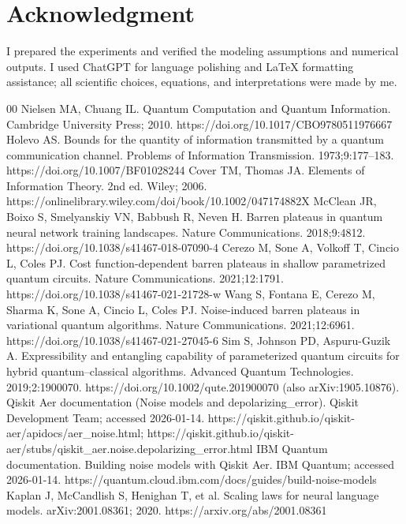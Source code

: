 \documentclass[]{ieeeaccess}
\begin{document}
\section*{Acknowledgment}
I prepared the experiments and verified the modeling assumptions and numerical outputs. I used ChatGPT \cite{ref19} for language polishing and \LaTeX{} formatting assistance; all scientific choices, equations, and interpretations were made by me.

\FloatBarrier
\begin{thebibliography}{00}
 Nielsen MA, Chuang IL. Quantum Computation and Quantum Information. Cambridge University Press; 2010. https://doi.org/10.1017/CBO9780511976667
 Holevo AS. Bounds for the quantity of information transmitted by a quantum communication channel. Problems of Information Transmission. 1973;9:177--183. https://doi.org/10.1007/BF01028244
 Cover TM, Thomas JA. Elements of Information Theory. 2nd ed. Wiley; 2006. https://onlinelibrary.wiley.com/doi/book/10.1002/047174882X
 McClean JR, Boixo S, Smelyanskiy VN, Babbush R, Neven H. Barren plateaus in quantum neural network training landscapes. Nature Communications. 2018;9:4812. https://doi.org/10.1038/s41467-018-07090-4
 Cerezo M, Sone A, Volkoff T, Cincio L, Coles PJ. Cost function-dependent barren plateaus in shallow parametrized quantum circuits. Nature Communications. 2021;12:1791. https://doi.org/10.1038/s41467-021-21728-w
 Wang S, Fontana E, Cerezo M, Sharma K, Sone A, Cincio L, Coles PJ. Noise-induced barren plateaus in variational quantum algorithms. Nature Communications. 2021;12:6961. https://doi.org/10.1038/s41467-021-27045-6
 Sim S, Johnson PD, Aspuru-Guzik A. Expressibility and entangling capability of parameterized quantum circuits for hybrid quantum--classical algorithms. Advanced Quantum Technologies. 2019;2:1900070. https://doi.org/10.1002/qute.201900070 (also arXiv:1905.10876).
 Qiskit Aer documentation (Noise models and depolarizing\_error). Qiskit Development Team; accessed 2026-01-14. https://qiskit.github.io/qiskit-aer/apidocs/aer\_noise.html; https://qiskit.github.io/qiskit-aer/stubs/qiskit\_aer.noise.depolarizing\_error.html
 IBM Quantum documentation. Building noise models with Qiskit Aer. IBM Quantum; accessed 2026-01-14. https://quantum.cloud.ibm.com/docs/guides/build-noise-models
 Kaplan J, McCandlish S, Henighan T, et al. Scaling laws for neural language models. arXiv:2001.08361; 2020. https://arxiv.org/abs/2001.08361

\end{thebibliography}
\end{document}
